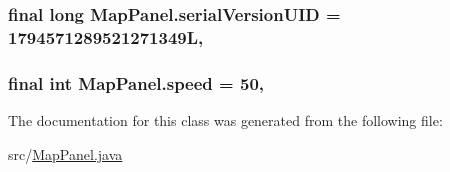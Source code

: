 \hypertarget{classMapPanel_a63b76f204807ce3eefbe8e01a80359d6}{
\subsubsection[{serial\-Version\-U\-I\-D}]{\setlength{\rightskip}{0pt plus 5cm}final long Map\-Panel.\-serial\-Version\-U\-I\-D = 1794571289521271349\-L\hspace{0.3cm}{\ttfamily [static]}, {\ttfamily [private]}}}\label{classMapPanel_a63b76f204807ce3eefbe8e01a80359d6}
\hypertarget{classMapPanel_ac8a10b9f2d89e400c0b9ad615459a35c}{
\subsubsection[{speed}]{\setlength{\rightskip}{0pt plus 5cm}final int Map\-Panel.\-speed = 50\hspace{0.3cm}{\ttfamily [static]}, {\ttfamily [private]}}}\label{classMapPanel_ac8a10b9f2d89e400c0b9ad615459a35c}


The documentation for this class was generated from the following file\-:\begin{DoxyCompactItemize}
\item 
src/\hyperlink{MapPanel_8java}{Map\-Panel.\-java}\end{DoxyCompactItemize}
